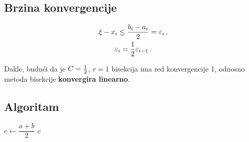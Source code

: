 \subsection{Brzina konvergencije}

\begin{gather*}
    \xi - x_i \leq \frac{b_i-a_i}{2} = \varepsilon_i\,,\\
    \varepsilon_i={1\over 2} \varepsilon_{i-1}\,.
\end{gather*}

Dakle, budući da je $C={1\over 2}$, $r=1$ bisekcija ima red konvergencije 1,
odnosno metoda bisekcije \textbf{konvergira linearno}.

\subsection{Algoritam}

\begin{algorithmic}
    \State $c \gets \dfrac{a + b}{2}$
        \State \Return $c$
    \EndIf
        \State \Return {}
    \Else
        \State \Return {}
    \EndIf
\EndFunction
\end{algorithmic}
